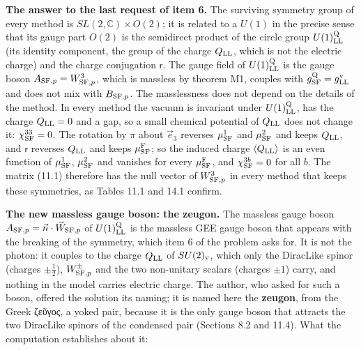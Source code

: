 \documentclass[
  10pt,
]{article}
\begin{document}
\textbf{The answer to the last request of item 6.} The surviving
symmetry group of every method is \(SL(2,\mathbb C)\times O(2)\); it is
related to a \(U(1)\) in the precise sense that its gauge part \(O(2)\)
is the semidirect product of the circle group \(U(1)^{\rm Q}_{\rm LL}\)
(its identity component, the group of the charge \(Q_{\rm LL}\), which
is not the electric charge) and the charge conjugation \(\mathsf r\).
The gauge field of \(U(1)^{\rm Q}_{\rm LL}\) is the gauge boson
\(A_{{\rm SF},p}=W^3_{{\rm SF},p}\), which is massless by theorem M1,
couples with \(g^{\rm Q}_{\rm SF}=g^{\rm v}_{\rm LL}\) and does not mix
with \(B_{{\rm SF},p}\). The masslessness does not depend on the details
of the method. In every method the vacuum is invariant under
\(U(1)^{\rm Q}_{\rm LL}\), has the charge \(Q_{\rm LL}=0\) and a gap, so
a small chemical potential of \(Q_{\rm LL}\) does not change it:
\(\chi^{33}_{\rm SF}=0\). The rotation by \(\pi\) about \(\vec e_3\)
reverses \(\mu^1_{\rm SF}\) and \(\mu^2_{\rm SF}\) and keeps
\(Q_{\rm LL}\), and \(\mathsf r\) reverses \(Q_{\rm LL}\) and keeps
\(\mu^{\rm F}_{\rm SF}\); so the induced charge
\(\langle Q_{\rm LL}\rangle\) is an even function of \(\mu^1_{\rm SF}\),
\(\mu^2_{\rm SF}\) and vanishes for every \(\mu^{\rm F}_{\rm SF}\), and
\(\chi^{3b}_{\rm SF}=0\) for all \(b\). The matrix (11.1) therefore has
the null vector of \(W^3_{{\rm SF},p}\) in every method that keeps these
symmetries, as Tables 11.1 and 14.1 confirm.

\textbf{The new massless gauge boson: the zeugon.} The massless gauge
boson \(A_{{\rm SF},p}=\vec n\cdot\vec W_{{\rm SF},p}\) of
\(U(1)^{\rm Q}_{\rm LL}\) is the massless GEE gauge boson that appears
with the breaking of the symmetry, which item 6 of the problem asks for.
It is not the photon: it couples to the charge \(Q_{\rm LL}\) of
\(SU(2)_{\rm v}\), which only the DiracLike spinor (charges
\(\pm\tfrac12\)), \(W^\pm_{{\rm SF},p}\) and the two non-unitary scalars
(charges \(\pm1\)) carry, and nothing in the model carries electric
charge. The author, who asked for such a boson, offered the solution its
naming; it is named here the \textbf{zeugon}, from the Greek ζεῦγος, a
yoked pair, because it is the only gauge boson that attracts the two
DiracLike spinors of the condensed pair (Sections 8.2 and 11.4). What
the computation establishes about it:
\end{document}
